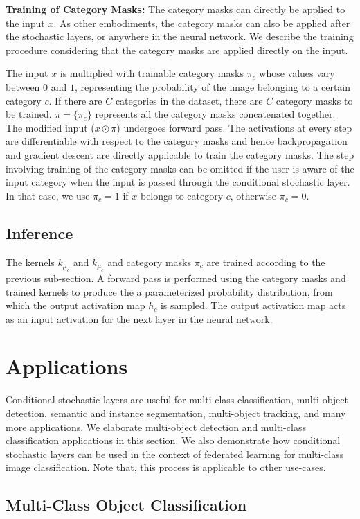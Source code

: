 \documentclass[12pt, letterpaper]{article}
\begin{document}
\noindent \textbf{Training of Category Masks:}
The category masks can directly be applied to the input $x$. As other embodiments, the category masks can also be applied after the stochastic layers, or anywhere in the neural network. We describe the training procedure considering that the category masks are applied directly on the input.

The input $x$ is multiplied with trainable category masks $\pi_c$ whose values vary between $0$ and $1$, representing the probability of the image belonging to a certain category $c$. If there are $C$ categories in the dataset, there are $C$ category masks to be trained. $\pi=\{\pi_c\}$ represents all the category masks concatenated together. The modified input ($x \odot \pi$) undergoes forward pass. The activations at every step are differentiable with respect to the category masks and hence backpropagation and gradient descent are directly applicable to train the category masks.
The step involving training of the category masks can be omitted if the user is aware of the input category when the input is passed through the conditional stochastic layer. In that case, we use $\pi_c=1$ if $x$ belongs to category $c$, otherwise $\pi_c=0$. 


\subsection{Inference}
The kernels $k_{\mu_c}$ and $k_{\mu_c}$ and category masks $\pi_c$ are trained according to the previous sub-section. A forward pass is performed using the category masks and trained kernels to produce the a parameterized probability distribution, from which the output activation map $h_c$ is sampled. The output activation map acts as an input activation for the next layer in the neural network. 
\section{Applications}
\label{sec:app}
Conditional stochastic layers are useful for multi-class classification, multi-object detection, semantic and instance segmentation, multi-object tracking, and many more applications. We elaborate multi-object detection and multi-class classification applications in this section. We also demonstrate how conditional stochastic layers can be used in the context of federated learning for multi-class image classification. Note that, this process is applicable to other use-cases.

\subsection{Multi-Class Object Classification}
\end{document}
